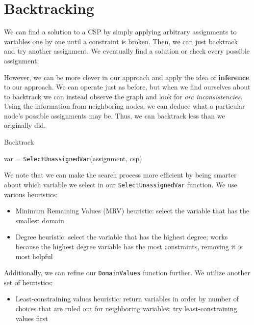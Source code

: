 \section{Backtracking}
We can find a solution to a CSP by simply applying arbitrary assignments to variables one by one until a constraint is broken. Then, we can just backtrack and try another assignment. We eventually find a solution or check every possible assignment. \par

However, we can be more clever in our approach and apply the idea of \textbf{inference} to our approach. We can operate just as before, but when we find ourselves about to backtrack we can instead observe the graph and look for \emph{arc inconsistencies}. Using the information from neighboring nodes, we can deduce what a particular node's possible assignments may be. Thus, we can backtrack less than we originally did. \par

\begin{algorithm}[H]
	\DontPrintSemicolon
	\caption{Backtrack}
	var = \texttt{SelectUnassignedVar}(assignment, csp) \\
\end{algorithm}

We note that we can make the search process more efficient by being smarter about which variable we select in our \texttt{SelectUnassignedVar} function. We use various heuristics:
\begin{itemize}
	\item Minimum Remaining Values (MRV) heuristic: select the variable that has the smallest domain
	\item Degree heuristic: select the variable that has the highest degree; works because the highest degree variable has the most constraints, removing it is most helpful
\end{itemize}

Additionally, we can refine our \texttt{DomainValues} function further. We utilize another set of heuristics:
\begin{itemize}
	\item Least-constraining values heuristic: return variables in order by number of choices that are ruled out for neighboring variables; try least-constraining values first
\end{itemize}